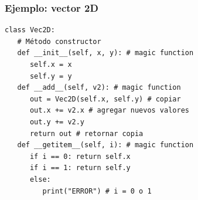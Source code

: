 \documentclass[14pt,aspectratio=169,xcolor=dvipsnames]{beamer}
\begin{document}
\begin{frame}[fragile]\frametitle{Ejemplo: vector 2D}
    \begin{footnotesize}
    \begin{verbatim}
class Vec2D:
   # Método constructor
   def __init__(self, x, y): # magic function
      self.x = x 
      self.y = y
   def __add__(self, v2): # magic function
      out = Vec2D(self.x, self.y) # copiar
      out.x += v2.x # agregar nuevos valores
      out.y += v2.y
      return out # retornar copia
   def __getitem__(self, i): # magic function
      if i == 0: return self.x
      if i == 1: return self.y
      else:
         print("ERROR") # i = 0 o 1
    \end{verbatim}
    \end{footnotesize}
\end{frame}
\end{document}
